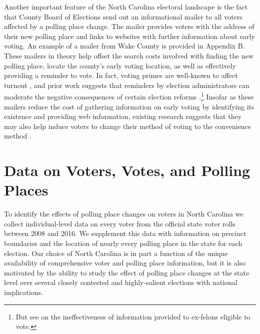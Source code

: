 \documentclass{cup_PSRM}
\begin{document}
Another important feature of the North Carolina electoral landscape is the fact that County Board of Elections send out an informational mailer to all voters affected by a polling place change.  The mailer provides voters with the address of their new polling place and links to websites with further information about early voting. An example of a mailer from Wake County is provided in Appendix B. These mailers in theory help offset the search costs involved with finding the new polling place, locate the county's early voting location, as well as effectively providing a reminder to vote.  In fact, voting primes are well-known to affect turnout \citep{gerber2000effects, gerber2008social}, and prior work suggests that reminders by election administrators can moderate the negative consequences of certain election reforms \citep{bergman2011changing}.\footnote{But see \cite{meredith2014voting} on the ineffectiveness of information provided to ex-felons eligible to vote.}  Insofar as these mailers reduce the cost of gathering information on early voting by identifying its existence and providing web information, existing research suggests that they may also help induce voters to change their method of voting to the convenience method \citep{monroesylvesterVoteByMail,votingmessagesmilitary}.



\section{Data on Voters, Votes, and Polling Places}\label{section_data}

\noindent  To identify the effects of polling place changes on voters in North Carolina we collect individual-level data on every voter from the official state voter rolls between 2008 and 2016.  We supplement this data with information on precinct boundaries and the location of nearly every polling place in the state for each election.  Our choice of North Carolina is in part a function of the unique availability of comprehensive voter and polling place information, but it is also motivated by the ability to study the effect of polling place changes at the state level over several closely contested and highly-salient elections with national implications.
\end{document}

